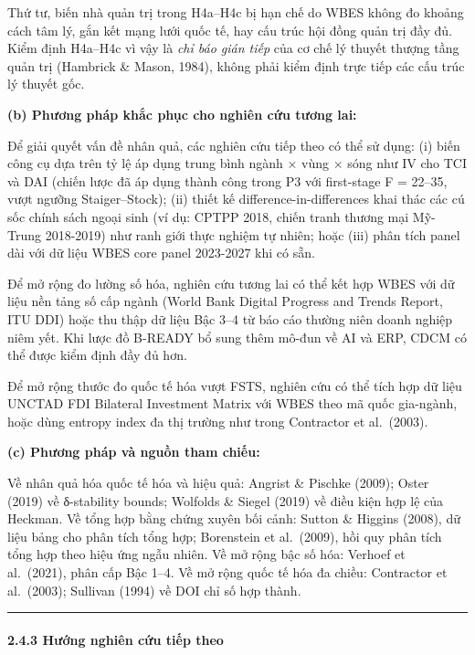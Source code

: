\documentclass[
  a4paper,
  13pt]{extreport}
\begin{document}
Thứ tư, biến nhà quản trị trong H4a--H4c bị hạn chế do WBES không đo
khoảng cách tâm lý, gắn kết mạng lưới quốc tế, hay cấu trúc hội đồng
quản trị đầy đủ. Kiểm định H4a--H4c vì vậy là \emph{chỉ báo gián tiếp}
của cơ chế lý thuyết thượng tầng quản trị (Hambrick \& Mason, 1984),
không phải kiểm định trực tiếp các cấu trúc lý thuyết gốc.

\textbf{(b) Phương pháp khắc phục cho nghiên cứu tương lai:}

Để giải quyết vấn đề nhân quả, các nghiên cứu tiếp theo có thể sử dụng:
(i) biến công cụ dựa trên tỷ lệ áp dụng trung bình ngành × vùng × sóng
như IV cho TCI và DAI (chiến lược đã áp dụng thành công trong P3 với
first-stage F = 22--35, vượt ngưỡng Staiger--Stock); (ii) thiết kế
difference-in-differences khai thác các cú sốc chính sách ngoại sinh (ví
dụ: CPTPP 2018, chiến tranh thương mại Mỹ-Trung 2018-2019) như ranh giới
thực nghiệm tự nhiên; hoặc (iii) phân tích panel dài với dữ liệu WBES
core panel 2023-2027 khi có sẵn.

Để mở rộng đo lường số hóa, nghiên cứu tương lai có thể kết hợp WBES với
dữ liệu nền tảng số cấp ngành (World Bank Digital Progress and Trends
Report, ITU DDI) hoặc thu thập dữ liệu Bậc 3--4 từ báo cáo thường niên
doanh nghiệp niêm yết. Khi lược đồ B-READY bổ sung thêm mô-đun về AI và
ERP, CDCM có thể được kiểm định đầy đủ hơn.

Để mở rộng thước đo quốc tế hóa vượt FSTS, nghiên cứu có thể tích hợp dữ
liệu UNCTAD FDI Bilateral Investment Matrix với WBES theo mã quốc
gia-ngành, hoặc dùng entropy index đa thị trường như trong Contractor et
al.~(2003).

\textbf{(c) Phương pháp và nguồn tham chiếu:}

Về nhân quả hóa quốc tế hóa và hiệu quả: Angrist \& Pischke (2009);
Oster (2019) về δ-stability bounds; Wolfolds \& Siegel (2019) về điều
kiện hợp lệ của Heckman. Về tổng hợp bằng chứng xuyên bối cảnh: Sutton
\& Higgins (2008), dữ liệu bảng cho phân tích tổng hợp; Borenstein et
al.~(2009), hồi quy phân tích tổng hợp theo hiệu ứng ngẫu nhiên. Về mở
rộng bậc số hóa: Verhoef et al.~(2021), phân cấp Bậc 1--4. Về mở rộng
quốc tế hóa đa chiều: Contractor et al.~(2003); Sullivan (1994) về DOI
chỉ số hợp thành.

\begin{center}\rule{0.5\linewidth}{0.5pt}\end{center}

\hypertarget{hux1b0ux1edbng-nghiuxean-cux1ee9u-tiux1ebfp-theo}{%
\paragraph{2.4.3 Hướng nghiên cứu tiếp
theo}\label{hux1b0ux1edbng-nghiuxean-cux1ee9u-tiux1ebfp-theo}}
\end{document}
